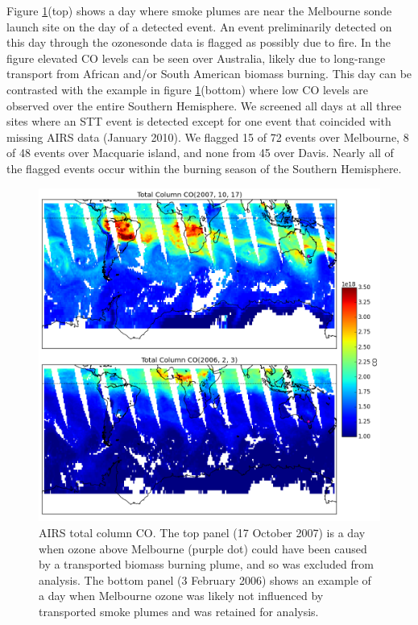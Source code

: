 \documentclass{article}
\begin{document}
    Figure \ref{fig:excludedeg}(top) shows a day where smoke plumes are near the Melbourne sonde launch site on the day of a detected event. 
    An event preliminarily detected on this day through the ozonesonde data is flagged as possibly due to fire.
    In the figure elevated CO levels can be seen over Australia, likely due to long-range transport from African and/or South American biomass burning.
    This day can be contrasted with the example in figure \ref{fig:excludedeg}(bottom) where low CO levels are observed over the entire Southern Hemisphere.
    We screened all days at all three sites where an STT event is detected except for one event that coincided with missing AIRS data (January 2010). 
    We flagged 15 of 72 events over Melbourne, 8 of 48 events over Macquarie island, and none from 45 over Davis.
    Nearly all of the flagged events occur within the burning season of the Southern Hemisphere.
    
    \begin{figure}[!htbp]
      \includegraphics[width=\textwidth]{figures/AIRS_compare.png}
      \caption{AIRS total column CO.
      The top panel (17 October 2007) is a day when ozone above Melbourne (purple dot) could have been caused by a transported biomass burning plume, and so was excluded from analysis.
      The bottom panel (3 February 2006) shows an example of a day when Melbourne ozone was likely not influenced by transported smoke plumes and was retained for analysis.}
      \label{fig:excludedeg}
    \end{figure}
    
\end{document}
